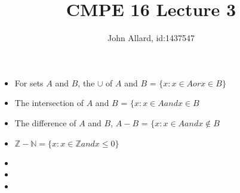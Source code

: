 \documentclass[a4paper,11pt]{article}
\title{ CMPE 16 Lecture 3}
\author{John Allard, id:1437547}
\begin{document}
\maketitle
\begin{itemize}
\item For sets  $A$ and $B$, the $\cup$ of $A$ and $B$ =  $\lbrace	x : x \in A or  x \in B \rbrace$  \\
\item The intersection of $A$ and $B$ = $\lbrace x : x\in A and x \in B$ \\
\item The difference of $A$ and $B$, $A-B$ = $\lbrace x : x \in A and x \not\in B$ \\
\item $\mathbb{Z}-\mathbb{N} = \lbrace x : x \in \mathbb{Z} and x \leq 0 \rbrace$
\item 
\item 
\item 
\end{itemize}
\end{document}
